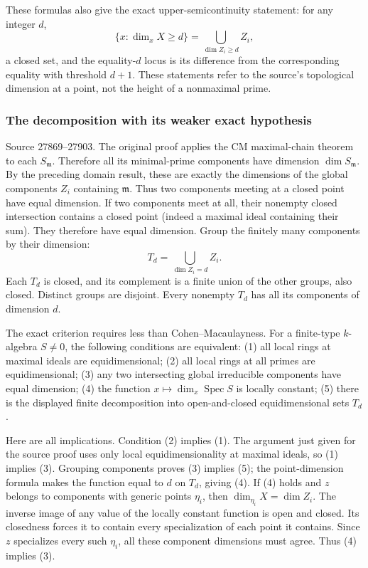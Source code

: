 These formulas also give the exact upper-semicontinuity statement: for any integer \(d\), \[
 \{x:\dim_xX\geq d\}=\bigcup_{\dim Z_i\geq d}Z_i,
\] a closed set, and the equality-\(d\) locus is its difference from the corresponding equality with threshold \(d+1\). These statements refer to the source's topological dimension at a point, not the height of a nonmaximal prime.

\subsubsection{The decomposition with its weaker exact hypothesis}\label{the-decomposition-with-its-weaker-exact-hypothesis}

Source 27869--27903. The original proof applies the CM maximal-chain theorem to each \(S_{\mathfrak m}\). Therefore all its minimal-prime components have dimension \(\dim S_{\mathfrak m}\). By the preceding domain result, these are exactly the dimensions of the global components \(Z_i\) containing \(\mathfrak m\). Thus two components meeting at a closed point have equal dimension. If two components meet at all, their nonempty closed intersection contains a closed point (indeed a maximal ideal containing their sum). They therefore have equal dimension. Group the finitely many components by their dimension: \[
 T_d=\bigcup_{\dim Z_i=d}Z_i.
\] Each \(T_d\) is closed, and its complement is a finite union of the other groups, also closed. Distinct groups are disjoint. Every nonempty \(T_d\) has all its components of dimension \(d\).

The exact criterion requires less than Cohen--Macaulayness. For a finite-type \(k\)-algebra \(S\ne0\), the following conditions are equivalent: (1) all local rings at maximal ideals are equidimensional; (2) all local rings at all primes are equidimensional; (3) any two intersecting global irreducible components have equal dimension; (4) the function \(x\mapsto\dim_x\operatorname{Spec}S\) is locally constant; (5) there is the displayed finite decomposition into open-and-closed equidimensional sets \(T_d\).

Here are all implications. Condition (2) implies (1). The argument just given for the source proof uses only local equidimensionality at maximal ideals, so (1) implies (3). Grouping components proves (3) implies (5); the point-dimension formula makes the function equal to \(d\) on \(T_d\), giving (4). If (4) holds and \(z\) belongs to components with generic points \(\eta_i\), then \(\dim_{\eta_i}X=\dim Z_i\). The inverse image of any value of the locally constant function is open and closed. Its closedness forces it to contain every specialization of each point it contains. Since \(z\) specializes every such \(\eta_i\), all these component dimensions must agree. Thus (4) implies (3).

